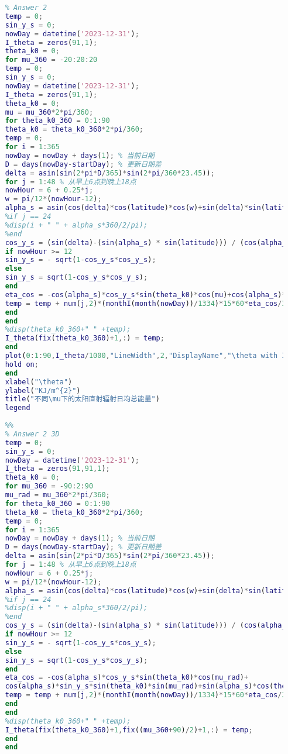 \documentclass[withoutpreface,bwprint]{cumcmthesis} %
\begin{document}
\begin{appendices}
\begin{lstlisting}[language=matlab]
	%%
	% Answer 2
	temp = 0;
	sin_y_s = 0;
	nowDay = datetime('2023-12-31');
	I_theta = zeros(91,1);
	theta_k0 = 0;
	for mu_360 = -20:20:20
	temp = 0;
	sin_y_s = 0;
	nowDay = datetime('2023-12-31');
	I_theta = zeros(91,1);
	theta_k0 = 0;
	mu = mu_360*2*pi/360;
	for theta_k0_360 = 0:1:90
	theta_k0 = theta_k0_360*2*pi/360; 
	temp = 0;
	for i = 1:365
	nowDay = nowDay + days(1); % 当前日期
	D = days(nowDay-startDay); % 更新日期差
	delta = asin(sin(2*pi*D/365)*sin(2*pi/360*23.45));
	for j = 1:48 % 从早上6点到晚上18点
	nowHour = 6 + 0.25*j;
	w = pi/12*(nowHour-12);
	alpha_s = asin(cos(delta)*cos(latitude)*cos(w)+sin(delta)*sin(latitude));
	%if j == 24
	%disp(i + " " + alpha_s*360/2/pi);
	%end
	cos_y_s = (sin(delta)-(sin(alpha_s) * sin(latitude))) / (cos(alpha_s) * cos(latitude));
	if nowHour >= 12
	sin_y_s = - sqrt(1-cos_y_s*cos_y_s);
	else 
	sin_y_s = sqrt(1-cos_y_s*cos_y_s);
	end
	eta_cos = -cos(alpha_s)*cos_y_s*sin(theta_k0)*cos(mu)+cos(alpha_s)*sin_y_s*sin(theta_k0)*sin(mu)+sin(alpha_s)*cos(theta_k0);
	temp = temp + num(j,2)*(monthI(month(nowDay))/1334)*15*60*eta_cos/365;
	end
	end
	%disp(theta_k0_360+" " +temp);
	I_theta(fix(theta_k0_360)+1,:) = temp;
	end
	plot(0:1:90,I_theta/1000,"LineWidth",2,"DisplayName","\theta with I with \mu = "+num2str(-mu_360));
	hold on;
	end
	xlabel("\theta")
	ylabel("KJ/m^{2}")
	title("不同\mu下的太阳直射辐射日均总能量")
	legend
	
	%%
	% Answer 2 3D
	temp = 0;
	sin_y_s = 0;
	nowDay = datetime('2023-12-31');
	I_theta = zeros(91,91,1);
	theta_k0 = 0;
	for mu_360 = -90:2:90
	mu_rad = mu_360*2*pi/360;
	for theta_k0_360 = 0:1:90
	theta_k0 = theta_k0_360*2*pi/360; 
	temp = 0;
	for i = 1:365
	nowDay = nowDay + days(1); % 当前日期
	D = days(nowDay-startDay); % 更新日期差
	delta = asin(sin(2*pi*D/365)*sin(2*pi/360*23.45));
	for j = 1:48 % 从早上6点到晚上18点
	nowHour = 6 + 0.25*j;
	w = pi/12*(nowHour-12);
	alpha_s = asin(cos(delta)*cos(latitude)*cos(w)+sin(delta)*sin(latitude));
	%if j == 24
	%disp(i + " " + alpha_s*360/2/pi);
	%end
	cos_y_s = (sin(delta)-(sin(alpha_s) * sin(latitude))) / (cos(alpha_s) * cos(latitude));
	if nowHour >= 12
	sin_y_s = - sqrt(1-cos_y_s*cos_y_s);
	else 
	sin_y_s = sqrt(1-cos_y_s*cos_y_s);
	end
	eta_cos = -cos(alpha_s)*cos_y_s*sin(theta_k0)*cos(mu_rad)+
	cos(alpha_s)*sin_y_s*sin(theta_k0)*sin(mu_rad)+sin(alpha_s)*cos(theta_k0);
	temp = temp + num(j,2)*(monthI(month(nowDay))/1334)*15*60*eta_cos/365;
	end
	end
	%disp(theta_k0_360+" " +temp);
	I_theta(fix(theta_k0_360)+1,fix((mu_360+90)/2)+1,:) = temp;
	end
	end
	
\end{lstlisting}




\end{appendices}
\end{document}
